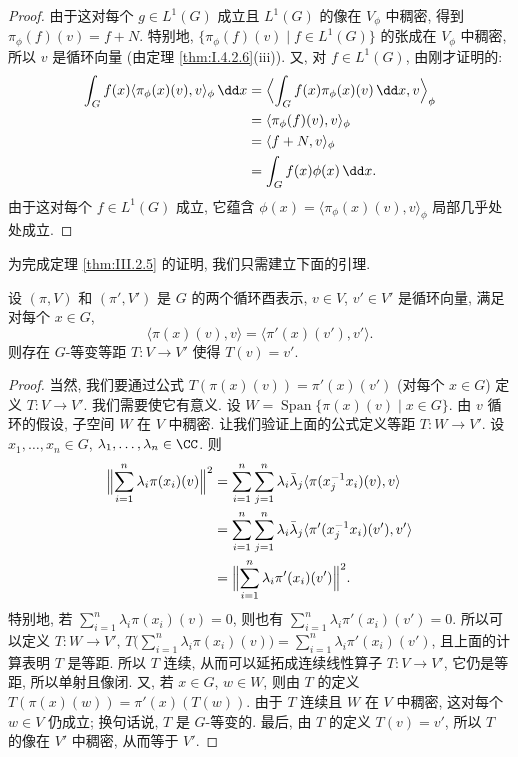 \begin{proof}
由于这对每个 $g \in L^1(G)$ 成立且 $L^1(G)$ 的像在 $V_{\phi}$ 中稠密, 得到 $\pi_{\phi}(f)(v) = f + N$. 特别地, $\{\pi_{\phi}(f)(v) \mid f \in L^1(G)\}$ 的张成在 $V_{\phi}$ 中稠密, 所以 $v$ 是循环向量 (由定理 \ref{thm:I.4.2.6}(iii)).
又, 对 $f \in L^1(G)$, 由刚才证明的:
\begin{align*}
\int_G f(x)\langle \pi_{\phi}(x)(v), v \rangle_{\phi}\,\dd x &= \Bigl\langle \int_G f(x)\pi_{\phi}(x)(v)\,\dd x, v \Bigr\rangle_{\phi} \\
&= \langle \pi_{\phi}(f)(v), v \rangle_{\phi} \\
&= \langle f + N, v \rangle_{\phi} \\
&= \int_G f(x)\phi(x)\,\dd x.
\end{align*}
由于这对每个 $f \in L^1(G)$ 成立, 它蕴含 $\phi(x) = \langle \pi_{\phi}(x)(v), v \rangle_{\phi}$ 局部几乎处处成立.
\end{proof}

为完成定理 \ref{thm:III.2.5} 的证明, 我们只需建立下面的引理.

\begin{lemma}[唯一性]
\label{lem:III.2.8}
设 $(\pi, V)$ 和 $(\pi', V')$ 是 $G$ 的两个循环酉表示, $v \in V$, $v' \in V'$ 是循环向量, 满足对每个 $x \in G$,
\[
\langle \pi(x)(v), v \rangle = \langle \pi'(x)(v'), v' \rangle.
\]
则存在 $G$-等变等距 $T \colon V \to V'$ 使得 $T(v) = v'$.
\end{lemma}

\begin{proof}
当然, 我们要通过公式 $T(\pi(x)(v)) = \pi'(x)(v')$ (对每个 $x \in G$) 定义 $T \colon V \to V'$. 我们需要使它有意义. 设 $W = \operatorname{Span}\{\pi(x)(v) \mid x \in G\}$. 由 $v$ 循环的假设, 子空间 $W$ 在 $V$ 中稠密. 让我们验证上面的公式定义等距 $T \colon W \to V'$. 设 $x_1, \ldots, x_n \in G$, $\lambda_1, \ldots, \lambda_n \in \CC$. 则
\begin{align*}
\Bigl\|\sum_{i=1}^n\lambda_i\pi(x_i)(v)\Bigr\|^2 &= \sum_{i=1}^n\sum_{j=1}^n\lambda_i\bar{\lambda}_j\langle \pi(x_j^{-1}x_i)(v), v \rangle \\
&= \sum_{i=1}^n\sum_{j=1}^n\lambda_i\bar{\lambda}_j\langle \pi'(x_j^{-1}x_i)(v'), v' \rangle \\
&= \Bigl\|\sum_{i=1}^n\lambda_i\pi'(x_i)(v')\Bigr\|^2.
\end{align*}
特别地, 若 $\sum_{i=1}^n\lambda_i\pi(x_i)(v) = 0$, 则也有 $\sum_{i=1}^n\lambda_i\pi'(x_i)(v') = 0$. 所以可以定义 $T \colon W \to V'$, $T\bigl(\sum_{i=1}^n\lambda_i\pi(x_i)(v)\bigr) = \sum_{i=1}^n\lambda_i\pi'(x_i)(v')$, 且上面的计算表明 $T$ 是等距. 所以 $T$ 连续, 从而可以延拓成连续线性算子 $T \colon V \to V'$, 它仍是等距, 所以单射且像闭. 又, 若 $x \in G$, $w \in W$, 则由 $T$ 的定义 $T(\pi(x)(w)) = \pi'(x)(T(w))$. 由于 $T$ 连续且 $W$ 在 $V$ 中稠密, 这对每个 $w \in V$ 仍成立; 换句话说, $T$ 是 $G$-等变的. 最后, 由 $T$ 的定义 $T(v) = v'$, 所以 $T$ 的像在 $V'$ 中稠密, 从而等于 $V'$.
\end{proof}

